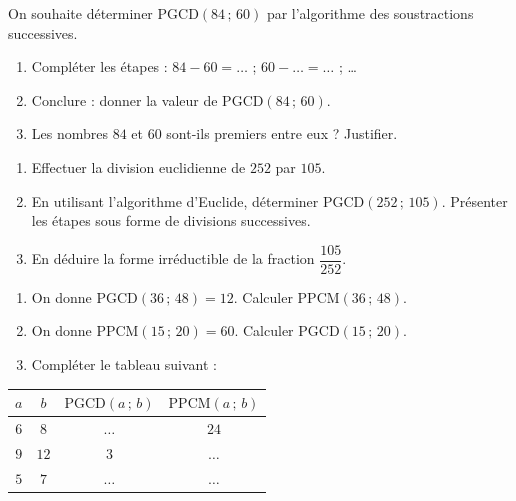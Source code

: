\documentclass[11pt]{article}
\begin{document}
\begin{exercice}
On souhaite déterminer $\mathrm{PGCD}(84\,;\,60)$ par l'algorithme des soustractions successives.
\begin{enumerate}
  \item Compléter les étapes : $84 - 60 = \ldots$ ; $60 - \ldots = \ldots$ ; \ldots
  \item Conclure : donner la valeur de $\mathrm{PGCD}(84\,;\,60)$.
  \item Les nombres $84$ et $60$ sont-ils premiers entre eux ? Justifier.
\end{enumerate}
\end{exercice}

\begin{exercice}
\begin{enumerate}
  \item Effectuer la division euclidienne de $252$ par $105$.
  \item En utilisant l'algorithme d'Euclide, déterminer $\mathrm{PGCD}(252\,;\,105)$. Présenter les étapes sous forme de divisions successives.
  \item En déduire la forme irréductible de la fraction $\dfrac{105}{252}$.
\end{enumerate}
\end{exercice}

\begin{exercice}
\begin{enumerate}
  \item On donne $\mathrm{PGCD}(36\,;\,48) = 12$. Calculer $\mathrm{PPCM}(36\,;\,48)$.
  \item On donne $\mathrm{PPCM}(15\,;\,20) = 60$. Calculer $\mathrm{PGCD}(15\,;\,20)$.
  \item Compléter le tableau suivant :
\end{enumerate}
\begin{center}
\begin{tabular}{|c|c|c|c|}
\hline
$a$ & $b$ & $\mathrm{PGCD}(a\,;\,b)$ & $\mathrm{PPCM}(a\,;\,b)$ \\
\hline
$6$ & $8$ & $\ldots$ & $24$ \\
\hline
$9$ & $12$ & $3$ & $\ldots$ \\
\hline
$5$ & $7$ & $\ldots$ & $\ldots$ \\
\hline
\end{tabular}
\end{center}
\end{exercice}
\end{document}
